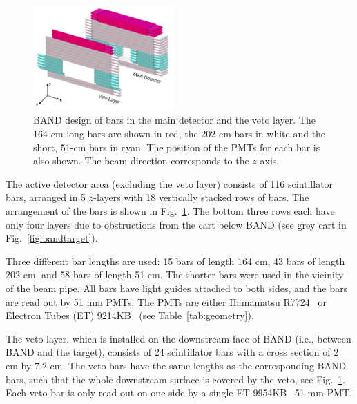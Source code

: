 \documentclass[3p,twocolumn]{elsarticle}
\begin{document}
\begin{figure}[tb]
	\centering
			\includegraphics[width=0.48\textwidth]{band-schematic.jpg}
            \caption{BAND design of bars in the main
                   detector and the veto layer. The 164-\si{\centi\meter} long bars are shown in
                          red, the 202-\si{\centi\meter} bars in white
                          and the short, 51-\si{\centi\meter} bars in cyan. The position of
                          the PMTs for each bar is also shown. The beam direction corresponds to the $z$-axis.   }
		\label{fig:design}
\end{figure}

The active detector area (excluding the veto layer) consists of 116 scintillator bars, arranged
in 5 $z$-layers with 18 vertically stacked rows of bars. The arrangement of the
bars is shown in Fig.~\ref{fig:design}. The bottom three rows each have only
four layers due to obstructions from the cart below BAND (see grey cart in Fig.~\ref{fig:bandtarget}).

Three different bar lengths are used: 15 bars of length 164 \si{\centi\meter}, 43 bars of length 202 \si{\centi\meter}, and 58 bars of length 
51 \si{\centi\meter}. The shorter bars were used in the vicinity of
the beam pipe. All bars have light guides attached to both sides, and the bars
are read out by 51 \si{\milli\meter} PMTs. The PMTs are either Hamamatsu R7724~\cite{pmtR7724} or Electron Tubes (ET) 9214KB~\cite{pmt9214} (see Table~\ref{tab:geometry}).

The veto layer, which is installed on the downstream face of BAND
(i.e., between BAND and the target),
consists of 24 scintillator bars with a cross section of $2$
\si{\centi\meter} by $7.2$ \si{\centi\meter}. The veto bars have the
same lengths as the corresponding BAND bars, such that the whole
downstream surface is covered by the veto, see
Fig.~\ref{fig:design}. Each veto bar is only read out on one side by a
single ET 9954KB~\cite{pmt9954} 51 \si{\milli\meter} PMT.
\end{document}
